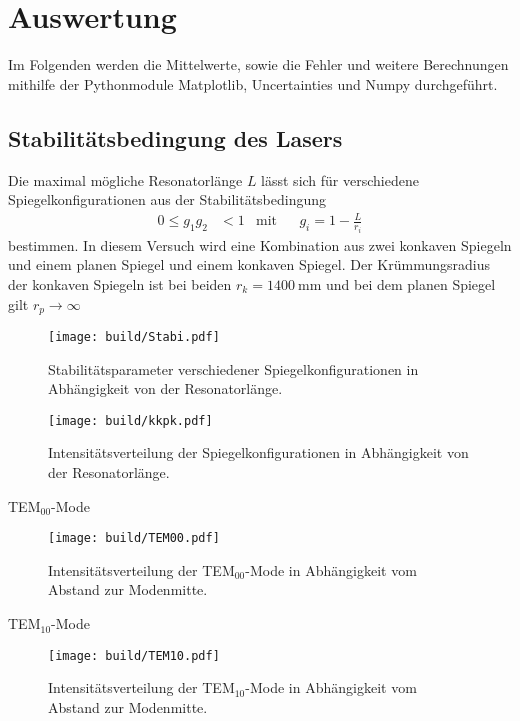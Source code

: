 \section{Auswertung}
\label{sec:Auswertung}

Im Folgenden werden die Mittelwerte, sowie die Fehler und weitere Berechnungen mithilfe der Pythonmodule Matplotlib\cite{matplotlib},
Uncertainties\cite{uncertainties} und Numpy\cite{numpy} durchgeführt.

\subsection{Stabilitätsbedingung des Lasers}
\label{subsec:Stabilitätsbedingung}
Die maximal mögliche Resonatorlänge $L$ lässt sich für verschiedene Spiegelkonfigurationen aus der Stabilitätsbedingung
\begin{align*}
  0 \leq g_1 g_2 &< 1 & \text{mit}& & g_i = 1 - \frac{L}{r_i}
\end{align*}
bestimmen. In diesem Versuch wird eine Kombination aus zwei konkaven Spiegeln und einem planen Spiegel und einem konkaven Spiegel.
Der Krümmungsradius der konkaven Spiegeln ist bei beiden $r_k = \qty{1400}{\milli\meter}$ und bei dem planen Spiegel gilt $r_p \to \infty$


\begin{figure}[H]
  \centering
  \texttt{[image: build/Stabi.pdf]}
  \caption {Stabilitätsparameter verschiedener Spiegelkonfigurationen in Abhängigkeit von der Resonatorlänge.}
  \label{fig:Stabi}
\end{figure}

\begin{figure}[H]
  \centering
  \texttt{[image: build/kkpk.pdf]}
  \caption {Intensitätsverteilung der Spiegelkonfigurationen in Abhängigkeit von der Resonatorlänge.}
  \label{fig:kkpk}
\end{figure}

TEM$_{00}$-Mode

\begin{figure}[H]
  \centering
  \texttt{[image: build/TEM00.pdf]}
  \caption {Intensitätsverteilung der TEM$_{00}$-Mode in Abhängigkeit vom Abstand zur Modenmitte.}
  \label{fig:TEM00}
\end{figure}

TEM$_{10}$-Mode

\begin{figure}[H]
  \centering
  \texttt{[image: build/TEM10.pdf]}
  \caption {Intensitätsverteilung der TEM$_{10}$-Mode in Abhängigkeit vom Abstand zur Modenmitte.}
  \label{fig:TEM10}
\end{figure}

